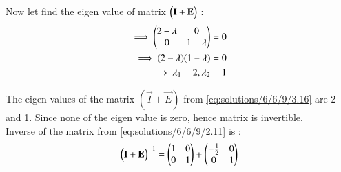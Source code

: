 Now let find the eigen value of matrix $\begin{pmatrix}\mathbf{I} + \mathbf{E}\end{pmatrix}$ :
\begin{align}
\implies \begin{pmatrix}2 - \lambda  & 0 \\ 0  &  1 - \lambda\end{pmatrix} = 0\\
\implies (2-\lambda)(1 - \lambda) = 0\\
\implies \lambda_1 = 2, \lambda_2 = 1 \label{eq:solutions/6/6/9/3.16}
\end{align}
 
The eigen values of the matrix $(\vec{I} + \vec{E})$ from \eqref{eq:solutions/6/6/9/3.16} are  2 and 1. Since none of the eigen value is zero, hence matrix is invertible.\\
Inverse of the matrix  from \eqref{eq:solutions/6/6/9/2.11} is :
\begin{align}
  \begin{pmatrix}\mathbf{I} + \mathbf{E}\end{pmatrix}^{-1} =\begin{pmatrix}1 & 0 \\ 0 & 1\end{pmatrix} +  \begin{pmatrix} -\frac{1}{2} & 0 \\ 0 & 1\end{pmatrix} \label{eq:solutions/6/6/9/3.19}
\end{align}
	
